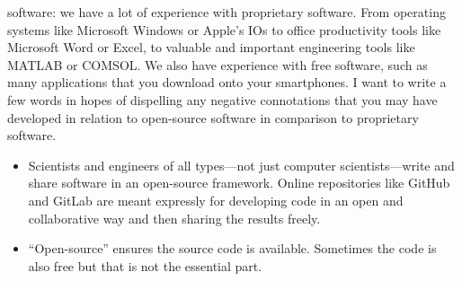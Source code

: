  software:
we have a lot of experience with proprietary software. From operating systems like Microsoft Windows or Apple's IOs to office productivity tools like Microsoft Word or Excel, to valuable and important engineering tools like MATLAB or COMSOL.  We also have experience with free software, such as many applications that you download onto your smartphones.  I want to write a few words in hopes of dispelling any negative connotations that you may have developed in relation to open-source software in comparison to proprietary software.
\begin{itemize}
\item Scientists and engineers of all types---not just computer scientists---write and share software in an open-source framework.  Online repositories like GitHub and GitLab are meant expressly for developing code in an open and collaborative way and then sharing the results freely.
\item ``Open-source'' ensures the source code is available.  Sometimes the code is also free but that is not the essential part.


\end{itemize}

